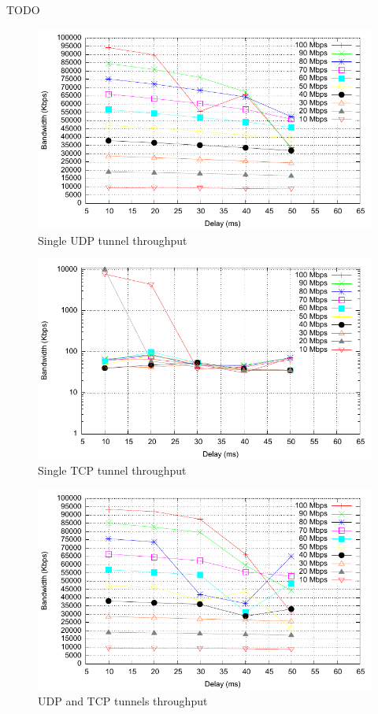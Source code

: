 TODO

\begin{figure}
  \centering
  \includegraphics[width=\textwidth]{img/test-udp}
  \caption{Single UDP tunnel throughput}
  \label{fig:udp}
\end{figure}

\begin{figure}
  \centering
  \includegraphics[width=\textwidth]{img/test-tcp}
  \caption{Single TCP tunnel throughput}
  \label{fig:tcp}
\end{figure}

\begin{figure}
  \centering
  \includegraphics[width=\textwidth]{img/test-mptcp}
  \caption{UDP and TCP tunnels throughput}
  \label{fig:mptcp}
\end{figure}

